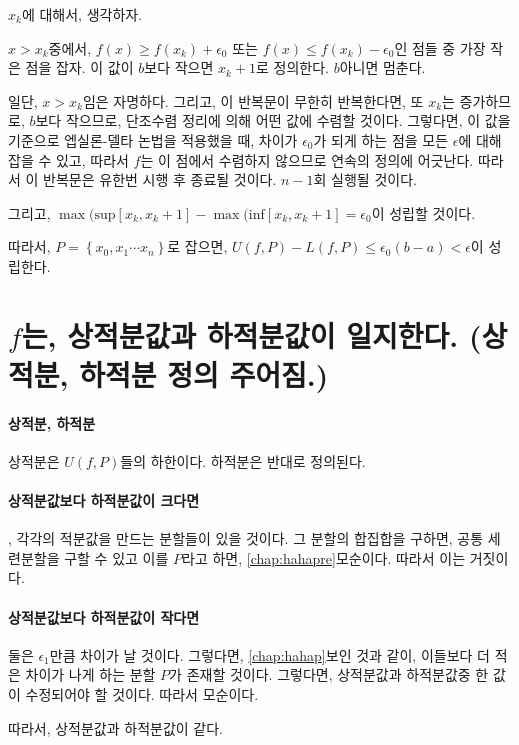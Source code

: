 $x_k$에 대해서, 생각하자.

$x>x_k$중에서, $f(x) \ge f(x_k)+\epsilon_0$ 또는 $f(x) \le f(x_k)-\epsilon_0$인 점들 중 가장 작은 점을 잡자. 이 값이 $b$보다 작으면  $x_k+1$로 정의한다. $b$아니면 멈춘다. 

일단, $x>x_k$임은 자명하다. 그리고, 이 반복문이 무한히 반복한다면, 또 $x_k$는 증가하므로, $b$보다 작으므로, 단조수렴 정리에 의해 어떤 값에 수렴할 것이다. 그렇다면, 이 값을 기준으로 엡실론-델타 논법을 적용했을 때, 차이가 $\epsilon_0$가 되게 하는 점을 모든 $\epsilon$에 대해 잡을 수 있고, 따라서 $f$는 이 점에서 수렴하지 않으므로 연속의 정의에 어긋난다.
따라서 이 반복문은 유한번 시행 후 종료될 것이다. $n-1$회 실행될 것이다.

그리고, $\max(\mathrm{sup}[x_k, x_k+1] - \max(\mathrm{inf}[x_k, x_k+1] = \epsilon_0$이 성립할 것이다.

따라서, $P=\left\{ x_0, x_1 \cdots x_n \right\}$로 잡으면, $U(f,P)-L(f,P) \le \epsilon_0 (b-a) < \epsilon$이 성립한다.

\section{$f$는, 상적분값과 하적분값이 일지한다. (상적분, 하적분 정의 주어짐.)}
\paragraph{상적분, 하적분}
상적분은 $U(f,P)$들의 하한이다. 하적분은 반대로 정의된다.

\paragraph{상적분값보다 하적분값이 크다면}, 각각의 적분값을 만드는 분할들이 있을 것이다. 그 분할의 합집합을 구하면, 공통 세련분할을 구할 수 있고 이를 $P$라고 하면, \ref{chap:hahapre} 모순이다. 따라서 이는 거짓이다.

\paragraph{상적분값보다 하적분값이 작다면} 둘은 $\epsilon_1$만큼 차이가 날 것이다. 그렇다면, \ref{chap:hahap} 보인 것과 같이, 이들보다 더 적은 차이가 나게 하는 분할 $P$가 존재할 것이다. 그렇다면, 상적분값과 하적분값중 한 값이 수정되어야 할 것이다. 따라서 모순이다.

따라서, 상적분값과 하적분값이 같다.


